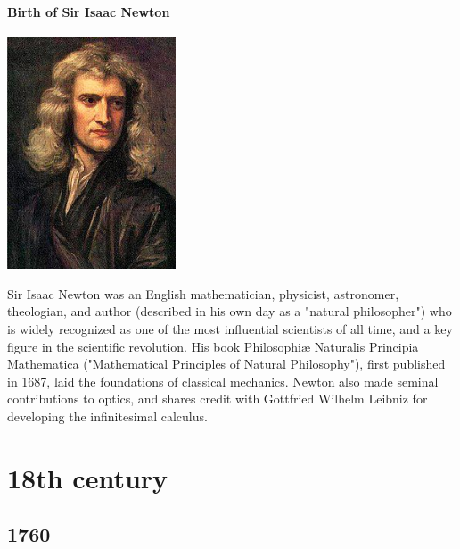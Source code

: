 \documentclass[11pt]{report}
\begin{document}
\subsection{Birth of Sir Isaac Newton}
\vspace{2mm}\begin{center}\includegraphics[width=5cm]{./img/isaacNewton.jpg}\end{center}
Sir Isaac Newton was an English mathematician, physicist, astronomer, theologian, and author (described in his own day as a "natural philosopher") who is widely recognized as one of the most influential scientists of all time, and a key figure in the scientific revolution. His book Philosophiæ Naturalis Principia Mathematica ("Mathematical Principles of Natural Philosophy"), first published in 1687, laid the foundations of classical mechanics. Newton also made seminal contributions to optics, and shares credit with Gottfried Wilhelm Leibniz for developing the infinitesimal calculus.

							
\part{18th century}
\chapter{1760}
\section{}
\end{document}
